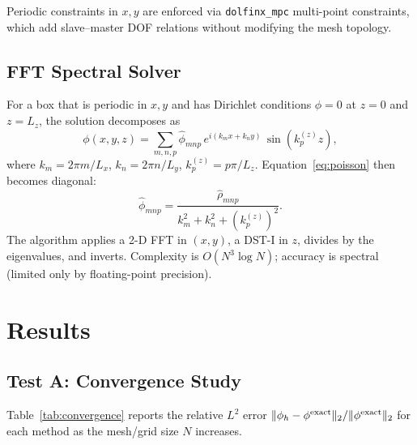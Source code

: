 \documentclass[11pt,a4paper]{article}
\begin{document}
Periodic constraints in $x,y$ are enforced via \texttt{dolfinx\_mpc}
multi-point constraints, which add slave--master DOF relations
without modifying the mesh topology.

\subsection{FFT Spectral Solver}
For a box that is periodic in $x,y$ and has Dirichlet conditions
$\phi=0$ at $z=0$ and $z=L_z$, the solution decomposes as
\begin{equation}
  \phi(x,y,z) = \sum_{m,n,p} \hat{\phi}_{mnp}\,
  e^{i(k_m x + k_n y)}\,\sin(k_p^{(z)} z),
\end{equation}
where $k_m = 2\pi m/L_x$, $k_n = 2\pi n/L_y$,
$k_p^{(z)} = p\pi/L_z$.
Equation~\eqref{eq:poisson} then becomes diagonal:
\begin{equation}
  \hat{\phi}_{mnp} =
  \frac{\hat{\rho}_{mnp}}{k_m^2 + k_n^2 + (k_p^{(z)})^2}.
\end{equation}
The algorithm applies a 2-D FFT in $(x,y)$, a DST-I in $z$, divides
by the eigenvalues, and inverts.  Complexity is $O(N^3 \log N)$;
accuracy is spectral (limited only by floating-point precision).

\section{Results}

\subsection{Test A: Convergence Study}

Table~\ref{tab:convergence} reports the relative $L^2$ error
$\|\phi_h - \phi^{\rm exact}\|_2 / \|\phi^{\rm exact}\|_2$
for each method as the mesh/grid size $N$ increases.
\end{document}
